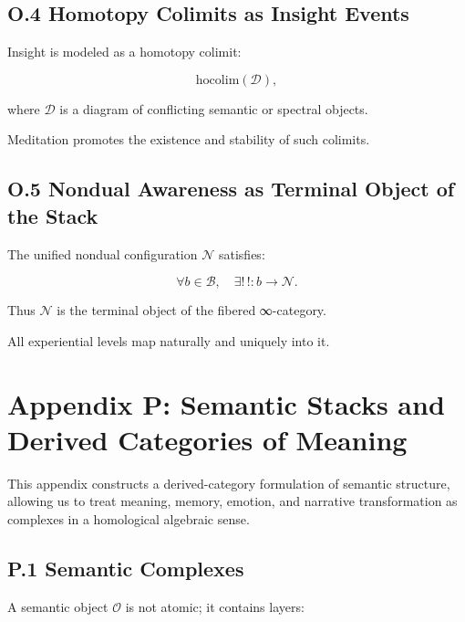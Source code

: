 \documentclass[12pt]{article}
\begin{document}
\subsection*{O.4 Homotopy Colimits as Insight Events}

Insight is modeled as a homotopy colimit:

\[
\mathrm{hocolim}(\mathcal{D}),
\]

where $\mathcal{D}$ is a diagram of conflicting semantic or spectral objects.

Meditation promotes the existence and stability of such colimits.

\subsection*{O.5 Nondual Awareness as Terminal Object of the Stack}

The unified nondual configuration $\mathcal{N}$ satisfies:

\[
\forall b \in \mathcal{B}, \quad \exists !\,! : b \to \mathcal{N}.
\]

Thus $\mathcal{N}$ is the terminal object of the fibered ∞-category.

All experiential levels map naturally and uniquely into it.


\section*{Appendix P: Semantic Stacks and Derived Categories of Meaning}

This appendix constructs a derived-category formulation of semantic structure,
allowing us to treat meaning, memory, emotion, and narrative transformation as
complexes in a homological algebraic sense.

\subsection*{P.1 Semantic Complexes}

A semantic object $\mathcal{O}$ is not atomic; it contains layers:
\end{document}

